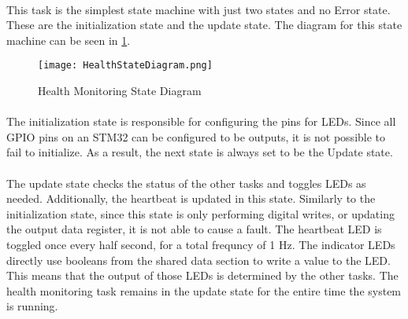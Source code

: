 \paragraph{}
This task is the simplest state machine with just two states and no Error state.
These are the initialization state and the update state.
The diagram for this state machine can be seen in \cref{fig:HealthDiagram}.

\begin{figure}[H]
	\centering
	\texttt{[image: HealthStateDiagram.png]}
	\caption{Health Monitoring State Diagram}
	\label{fig:HealthDiagram}
\end{figure}

\paragraph{}
The initialization state is responsible for configuring the pins for LEDs.
Since all GPIO pins on an STM32 can be configured to be outputs, it is not possible to fail to initialize.
As a result, the next state is always set to be the Update state.

\paragraph{}
The update state checks the status of the other tasks and toggles LEDs as needed.
Additionally, the heartbeat is updated in this state.
Similarly to the initialization state, since this state is only performing digital writes, or updating the output data register, it is not able to cause a fault.
The heartbeat LED is toggled once every half second, for a total frequncy of 1 Hz.
The indicator LEDs directly use booleans from the shared data section to write a value to the LED.
This means that the output of those LEDs is determined by the other tasks.
The health monitoring task remains in the update state for the entire time the system is running.
